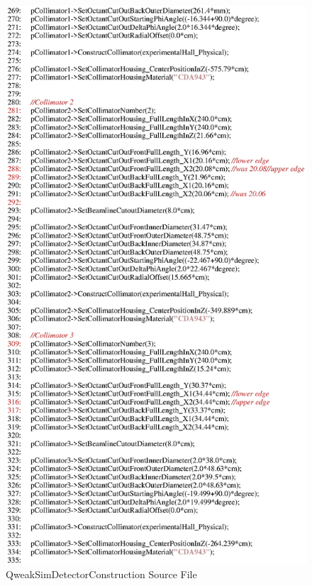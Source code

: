 \begin{figure}[ht]
  \hspace{0cm}
  \includegraphics[scale=0.8]{./figures4/QweakSimDetectorConstruction.cc-p5.eps}
  \caption{QweakSimDetectorConstruction Source File}
           \label{fig:V-SC-9}
\end{figure}
\clearpage

